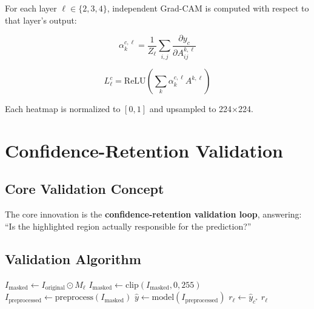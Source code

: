 \documentclass[12pt,a4paper,oneside]{book}
\begin{document}
For each layer $\ell \in \{2, 3, 4\}$, independent Grad-CAM is computed with respect to that layer's output:

\begin{equation}
\alpha_k^{c,\ell} = \frac{1}{Z_\ell} \sum_{i,j} \frac{\partial y_c}{\partial A_{ij}^{k,\ell}}
\label{eq:multilayer_gradcam}
\end{equation}

\begin{equation}
L_{\ell}^c = \text{ReLU}\left(\sum_{k} \alpha_k^{c,\ell} A^{k,\ell}\right)
\label{eq:multilayer_heatmap}
\end{equation}

Each heatmap is normalized to $[0,1]$ and upsampled to 224×224.

\section{Confidence-Retention Validation}

\subsection{Core Validation Concept}

The core innovation is the \textbf{confidence-retention validation loop}, answering: ``Is the highlighted region actually responsible for the prediction?''

\subsection{Validation Algorithm}

\begin{algorithm}[H]
\caption{Confidence-Retention Validation}
\begin{algorithmic}[1]
  \State $I_{\text{masked}} \gets I_{\text{original}} \odot M_\ell$
  \State $I_{\text{masked}} \gets \text{clip}(I_{\text{masked}}, 0, 255)$
  \State $I_{\text{preprocessed}} \gets \text{preprocess}(I_{\text{masked}})$
  \State $\hat{y} \gets \text{model}(I_{\text{preprocessed}})$
  \State $r_\ell \gets \hat{y}_{c^*}$
  \Return $r_\ell$
\EndProcedure
\end{algorithmic}
\end{algorithm}
\end{document}
